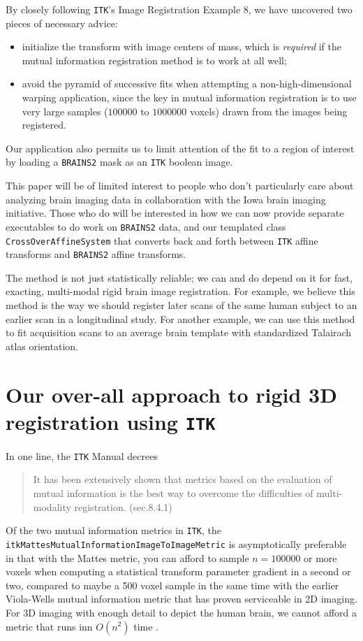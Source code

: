 \documentclass [10pt,twocolumn,twoside,final,letterpaper]{report}
\newcommand{\bcode}{\texttt}
\newcommand{\brainstwoprog}{\bcode{BRAINS2}}
\begin{document}
By closely following \bcode{ITK}'s Image Registration Example 8,
we have uncovered two pieces of necessary advice:
\begin{itemize}
\item initialize the transform with image centers of mass, which
is \emph{required} if the mutual information registration method is to work at all well;
\item avoid the pyramid of successive fits when attempting
a non-high-dimensional warping application, since the key in mutual information
registration is to use very large samples ($100000$ to $1000000$ voxels) drawn from
the images being registered.
\end{itemize}
Our application also permits us to limit attention
of the fit to a region of interest by loading a \brainstwoprog{} mask as an \bcode{ITK} boolean image.

This paper will be of limited interest to people who don't 
particularly care about analyzing brain imaging data 
in collaboration with the Iowa brain imaging initiative.
Those who do will be interested in how we can now provide separate executables
to do work on \brainstwoprog{} data, and our templated 
class \bcode{CrossOverAffineSystem} that converts
back and forth between \bcode{ITK} affine transforms and \brainstwoprog{} affine transforms.

\vspace{0.25in}\par

The method is not just statistically reliable;  we can and do depend on it for fast, 
exacting, multi-modal rigid brain image registration.  For example, we believe
this method is the way we should register later scans of the same human subject
to an earlier scan in a longitudinal study.  For another example, we can use this
method to fit acquisition scans to an average brain template 
with standardized Talairach atlas orientation.

\section{Our over-all approach to rigid 3D registration using \bcode{ITK}}

In one line, the \bcode{ITK} Manual decrees
\begin{quotation}
It has been extensively shown that metrics based on the evaluation
of mutual information is the best way to overcome the difficulties
of multi-modality registration. (sec.8.4.1)
\end{quotation}
\par
Of the two mutual information metrics in \bcode{ITK}, the
\bcode{itkMattesMutualInformationImageToImageMetric} is asymptotically
preferable in that with the Mattes metric, you can afford to sample $n=100000$ or more
voxels when computing a statistical transform parameter gradient in a second or two,
compared to maybe a 500 voxel sample in the same time with the earlier Viola-Wells 
mutual information metric that has proven serviceable in 2D imaging.
For 3D imaging with enough detail to depict the human brain,
we cannot afford a metric that runs inn $O(n^2)$ time .
\end{document}
